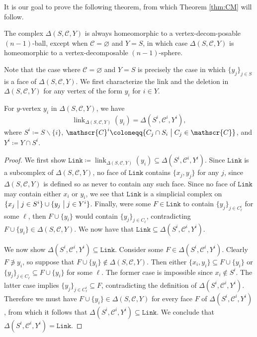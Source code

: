 \documentclass[ALCO,published]{cedram}
\numberwithin{equation}{section}
\newcommand{\st}{\bigm\vert}
\newcommand{\sC}{\mathscr{C}}
\renewcommand{\emptyset}{\varnothing}
\DeclareMathOperator{\link}{\mathrm{link}}
\newcommand{\Link}{\mathtt{Link}}
\newcommand{\1}{^{-1}}
\begin{document}
It is our goal to prove the following theorem, from which Theorem \ref{thm:CM} will follow.

\begin{thm}\label{homeo}
The complex $\Delta(S,\sC,Y)$ is always homeomorphic to a vertex-decom-posable $(n-1)$-ball, except when $\sC = \emptyset$ and $Y=S$, in which case $\Delta(S,\sC,Y)$ is homeomorphic to a vertex-decomposable $(n-1)$-sphere.
\end{thm}

Note that the case where $\sC = \emptyset$ and $Y=S$ is precisely the case in which $\{y_j\}_{j \in S}$ is a face of $\Delta(S,\sC,Y)$. We first characterize the link and the deletion in $\Delta(S,\sC,Y)$ for any vertex of the form $y_i$ for $i\in Y$.

\begin{prop}\label{link}
For $y$-vertex $y_i$ in $\Delta(S,\sC,Y)$, we have
\[
\link_{\Delta(S,\sC,Y)}(y_i) = \Delta(S^i,\sC^i,Y^i),
\]
where $S^i \coloneqq S \smallsetminus \{i\}$, $\sC^i \coloneqq \{C_j \cap S_i \st C_j \in \sC\}$, and $Y^i \coloneqq Y \cap S^i$.
\end{prop}
\begin{proof}
We first show $\Link \coloneqq \link_{\Delta(S,\sC,Y)}(y_i) \subseteq
\Delta(S^i,\sC^i,Y^i)$. Since $\Link$ is a subcomplex of
$\Delta(S,\sC,Y)$, no face of $\Link$ contains $\{x_j,y_j\}$ for any
$j$, since $\Delta(S,\sC,Y)$ is defined so as never to contain any
such face. Since no face of $\Link$ may contain either $x_i$ or $y_i$,
we see that $\Link$ is a simplicial complex on $\{x_j \st j \in S^i\}
\cup \{y_j \st j \in Y^i\}$. Finally, were some $F \in \Link$ to
contain  $\{y_j\}_{j \in C_\ell^i}$ for some $\ell$, then $F \cup
\{y_i\}$ would contain $\{y_j\}_{j \in C_\ell}$, contradicting $F \cup
\{y_i\} \in \Delta(S,\sC,Y)$. We now have that $\Link \subseteq
\Delta(S^i,\sC^i,Y^i)$.

 We now show $\Delta(S^i,\sC^i,Y^i) \subseteq \Link$. Consider some $F \in \Delta(S^i,\sC^i,Y^i)$. Clearly $F \not\ni y_i$, so suppose that $F \cup \{y_i\} \notin \Delta(S,\sC,Y)$. Then either $\{x_i,y_i\} \subseteq F \cup \{y_i\}$ or $\{y_j\}_{j \in C_\ell} \subseteq F \cup \{y_i\}$ for some $\ell$. The former case is impossible since $x_i \notin S^i$. The latter case implies $\{y_j\}_{j \in C_\ell^i} \subseteq F$, contradicting the definition of $\Delta(S^i,\sC^i,Y^i)$. Therefore we must have $F \cup \{y_i\} \in \Delta(S,\sC,Y)$ for every face $F$ of $\Delta(S^i,\sC^i,Y^i)$, from which it follows that $\Delta(S^i,\sC^i,Y^i) \subseteq \Link$. We conclude that $\Delta(S^i,\sC^i,Y^i) = \Link$.
\end{proof}
\end{document}
